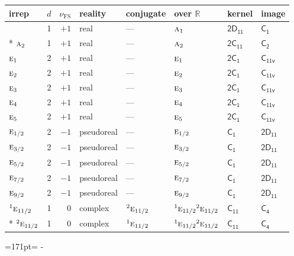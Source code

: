 \documentclass[10pt,a4paper]{article}
\makeatletter
\def\grouprule#1#2{\noalign{\marks\LTgroupmarks{\the\belowrulesep}\nobreak\vskip#1%
  \vskip\aboverulesep}\multispan\LT@cols\unskip{\leaders\hrule\@height#2\hfill\kern\z@}\cr
  \noalign{\penalty\LTrulebreak\vskip\belowrulesep\global\@lastruleclass\z@}}
\newcommand{\needspace}[1]{\par\penalty-100\begingroup\dimen0=#1\relax\dimen2=\pagegoal
  \advance\dimen2-\pagetotal\ifdim\dimen0>\dimen2\relax\ifdim\dimen2>0pt\vfil\break\fi\fi
  \endgroup}
\numberwithin{equation}{section}
\newcommand{\grp}[1]{\mathsf{#1}}
\newcommand{\irr}[1]{\text{\normalfont\scshape #1}}
\newcommand{\conjpair}[1]{{}^{#1}}
\newcommand{\detbox}[1]{{\setlength{\fboxsep}{1pt}\fbox{#1}}}
\newcommand{\fsind}{\nu_{\mathrm{FS}}}
\makeatother
\begin{document}
{\small\renewcommand{\arraystretch}{1.25}\setlength{\tabcolsep}{4pt}\begin{longtable}{@{}lrrlllll@{}}\toprule
irrep & $d$ & $\fsind$ & reality & conjugate & over $\mathbb{R}$ & kernel & image\\\midrule\endhead
\bottomrule\endfoot\endlastfoot
\detbox{$\irr{a}_{1}$} & 1 & $+1$ & real & --- & $\irr{a}_{1}$ & \href{2D11.pdf}{$\grp{2D_{11}}$} & \href{../../../rotation/data/pdf/C1.pdf}{$\grp{C_{1}}$}\\*
$\irr{a}_{2}$ & 1 & $+1$ & real & --- & $\irr{a}_{2}$ & \href{2C11.pdf}{$\grp{2C_{11}}$} & \href{../../../rotation/data/pdf/C2.pdf}{$\grp{C_{2}}$}\\
$\irr{e}_{1}$ & 2 & $+1$ & real & --- & $\irr{e}_{1}$ & \href{2C1.pdf}{$\grp{2C_{1}}$} & \href{../../../rotation/data/pdf/C11v.pdf}{$\grp{C_{11v}}$}\\
$\irr{e}_{2}$ & 2 & $+1$ & real & --- & $\irr{e}_{2}$ & \href{2C1.pdf}{$\grp{2C_{1}}$} & \href{../../../rotation/data/pdf/C11v.pdf}{$\grp{C_{11v}}$}\\
$\irr{e}_{3}$ & 2 & $+1$ & real & --- & $\irr{e}_{3}$ & \href{2C1.pdf}{$\grp{2C_{1}}$} & \href{../../../rotation/data/pdf/C11v.pdf}{$\grp{C_{11v}}$}\\
$\irr{e}_{4}$ & 2 & $+1$ & real & --- & $\irr{e}_{4}$ & \href{2C1.pdf}{$\grp{2C_{1}}$} & \href{../../../rotation/data/pdf/C11v.pdf}{$\grp{C_{11v}}$}\\
$\irr{e}_{5}$ & 2 & $+1$ & real & --- & $\irr{e}_{5}$ & \href{2C1.pdf}{$\grp{2C_{1}}$} & \href{../../../rotation/data/pdf/C11v.pdf}{$\grp{C_{11v}}$}\\
\grouprule{0pt}{\lightrulewidth}
$\irr{e}_{1/2}$ & 2 & $-1$ & pseudoreal & --- & $\irr{e}_{1/2}$ & \href{C1.pdf}{$\grp{C_{1}}$} & \href{2D11.pdf}{$\grp{2D_{11}}$}\\
$\irr{e}_{3/2}$ & 2 & $-1$ & pseudoreal & --- & $\irr{e}_{3/2}$ & \href{C1.pdf}{$\grp{C_{1}}$} & \href{2D11.pdf}{$\grp{2D_{11}}$}\\
$\irr{e}_{5/2}$ & 2 & $-1$ & pseudoreal & --- & $\irr{e}_{5/2}$ & \href{C1.pdf}{$\grp{C_{1}}$} & \href{2D11.pdf}{$\grp{2D_{11}}$}\\
$\irr{e}_{7/2}$ & 2 & $-1$ & pseudoreal & --- & $\irr{e}_{7/2}$ & \href{C1.pdf}{$\grp{C_{1}}$} & \href{2D11.pdf}{$\grp{2D_{11}}$}\\
$\irr{e}_{9/2}$ & 2 & $-1$ & pseudoreal & --- & $\irr{e}_{9/2}$ & \href{C1.pdf}{$\grp{C_{1}}$} & \href{2D11.pdf}{$\grp{2D_{11}}$}\\
$\conjpair{1}\irr{e}_{11/2}$ & 1 & $0$ & complex & $\conjpair{2}\irr{e}_{11/2}$ & $\conjpair{1}\irr{e}_{11/2}\conjpair{2}\irr{e}_{11/2}$ & \href{C11.pdf}{$\grp{C_{11}}$} & \href{../../../rotation/data/pdf/C4.pdf}{$\grp{C_{4}}$}\\*
$\conjpair{2}\irr{e}_{11/2}$ & 1 & $0$ & complex & $\conjpair{1}\irr{e}_{11/2}$ & $\conjpair{1}\irr{e}_{11/2}\conjpair{2}\irr{e}_{11/2}$ & \href{C11.pdf}{$\grp{C_{11}}$} & \href{../../../rotation/data/pdf/C4.pdf}{$\grp{C_{4}}$}\\
\bottomrule\end{longtable}}
\needspace{171pt}
\end{document}
